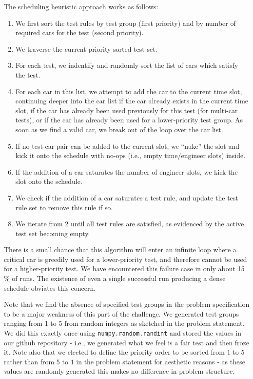 \documentclass[aps,pra,twocolumn,superscriptaddress,groupedaddress]{revtex4}  %
\begin{document}
The scheduling heuristic approach works as follows:
\begin{enumerate}
\item We first sort the test rules by test group (first priority) and by
number of required cars for the test (second priority).
\item We traverse the current priority-sorted test set.
\item For each test, we indentify and randomly sort the list of cars which
satisfy the test.
\item For each car in this list, we attempt to add the car to the current time
slot, continuing deeper into the car list if the car already exists in the
current time slot, if the car has already been used previously for this test
(for multi-car tests), or if the car has already been used for a lower-priority
test group. As soon as we find a valid car, we break out of the loop over the
car list.
\item If no test-car pair can be added to the current slot, we ``nuke'' the slot
and kick it onto the schedule with no-ops (i.e., empty time/engineer slots) inside. 
\item If the addition of a car saturates the number of engineer slots, we kick
the slot onto the schedule.
\item We check if the addition of a car saturates a test rule, and update the
test rule set to remove this rule if so.
\item We iterate from 2 until all test rules are satisfied, as evidenced by the
active test set becoming empty.
\end{enumerate}

There is a small chance that this algorithm will enter an infinite loop where a
critical car is greedily used for a lower-priority test, and therefore cannot be
used for a higher-priority test. We have encountered this failure case in only
about 15$\%$ of runs. The existence of even a single successful run producing a
dense schedule obviates this concern. 

Note that we find the absence of specified test groups in the problem
specification to be a major weakness of this part of the challenge. We generated
test groups ranging from 1 to 5 from random integers as sketched in the problem
statement. We did this exactly once using \texttt{numpy.random.randint} and
stored the values in our github repository - i.e., we generated what we feel is
a fair test and then froze it. Note also that we elected to define the priority
order to be sorted from $1$ to $5$ rather than from $5$ to $1$ in the problem
statement for aesthetic reasons - as these values are randomly generated this
makes no difference in problem structure.
\end{document}
